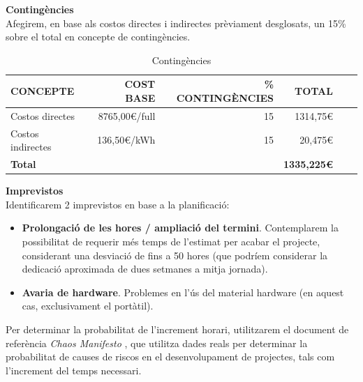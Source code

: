 \noindent \textbf{\large Contingències}\\

\noindent Afegirem, en base als costos directes i indirectes prèviament desglosats, un 15\% sobre el total en concepte de contingències.

\begin{table}[htb]
\centering
\label{PressupostContingencies}
\begin{tabular}{lrrrrr}
\hline \textbf{CONCEPTE}                           & {\color[HTML]{000000} \textbf{COST BASE}} & {\color[HTML]{000000} \textbf{\% CONTINGÈNCIES}} & {\color[HTML]{000000} \textbf{TOTAL}}\\ 
\hline
Costos directes                             & 8765,00\euro /full                                           & 15                                             & 1314,75\euro\\
Costos indirectes                                 & 136,50\euro /kWh                                           & 15                                           & 20,475\euro\\
\hline
\textbf{Total}                               &                              &                                & \textbf{1335,225\euro}       \\
\hline                      
\end{tabular}%
\caption{Contingències}
\end{table}

\noindent \textbf{\large Imprevistos}\\

\noindent Identificarem 2 imprevistos en base a la planificació:

\begin{itemize}
\item \textbf{Prolongació de les hores / ampliació del termini}. Contemplarem la possibilitat de requerir més temps de l’estimat per acabar el projecte, considerant una desviació de fins a 50 hores (que podríem considerar la dedicació aproximada de dues setmanes a mitja jornada).
\item \textbf{Avaria de hardware}. Problemes en l’ús del material hardware (en aquest cas, exclusivament el portàtil).
\end{itemize}

Per determinar la probabilitat de l'increment horari, utilitzarem el document de referència \textit{Chaos Manifesto} \cite{chaos}, que utilitza dades reals per determinar la probabilitat de causes de riscos en el desenvolupament de projectes, tals com l'increment del temps necessari.


